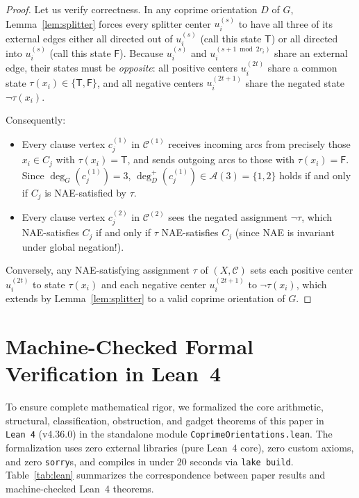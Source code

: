 \documentclass[11pt,a4paper]{article}
\theoremstyle{definition}
\theoremstyle{remark}
\newcommand{\outdeg}{\deg^{+}}
\newcommand{\Aset}{\mathcal{A}}
\begin{document}
\begin{proof}
Let us verify correctness. In any coprime orientation $D$ of $G$, Lemma~\ref{lem:splitter} forces every splitter center $u_i^{(s)}$ to have all three of its external edges either all directed out of $u_i^{(s)}$ (call this state $\mathsf{T}$) or all directed into $u_i^{(s)}$ (call this state $\mathsf{F}$). Because $u_i^{(s)}$ and $u_i^{(s+1 \bmod 2r_i)}$ share an external edge, their states must be \emph{opposite}: all positive centers $u_i^{(2t)}$ share a common state $\tau(x_i) \in \{\mathsf{T}, \mathsf{F}\}$, and all negative centers $u_i^{(2t+1)}$ share the negated state $\neg \tau(x_i)$.

Consequently:
\begin{itemize}[leftmargin=2em,itemsep=1pt]
  \item Every clause vertex $c_j^{(1)}$ in $\mathcal{C}^{(1)}$ receives incoming arcs from precisely those $x_i \in C_j$ with $\tau(x_i) = \mathsf{T}$, and sends outgoing arcs to those with $\tau(x_i) = \mathsf{F}$. Since $\deg_G(c_j^{(1)}) = 3$, $\outdeg_D(c_j^{(1)}) \in \Aset(3) = \{1, 2\}$ holds if and only if $C_j$ is NAE-satisfied by $\tau$.
  \item Every clause vertex $c_j^{(2)}$ in $\mathcal{C}^{(2)}$ sees the negated assignment $\neg \tau$, which NAE-satisfies $C_j$ if and only if $\tau$ NAE-satisfies $C_j$ (since NAE is invariant under global negation!).
\end{itemize}
Conversely, any NAE-satisfying assignment $\tau$ of $(X, \mathcal{C})$ sets each positive center $u_i^{(2t)}$ to state $\tau(x_i)$ and each negative center $u_i^{(2t+1)}$ to $\neg \tau(x_i)$, which extends by Lemma~\ref{lem:splitter} to a valid coprime orientation of $G$.
\end{proof}

\section{Machine-Checked Formal Verification in Lean~4}

To ensure complete mathematical rigor, we formalized the core arithmetic, structural, classification, obstruction, and gadget theorems of this paper in \texttt{Lean~4} (v4.36.0) in the standalone module \texttt{CoprimeOrientations.lean}. The formalization uses zero external libraries (pure Lean~4 core), zero custom axioms, and zero \texttt{sorry}s, and compiles in under $20$ seconds via \texttt{lake build}. Table~\ref{tab:lean} summarizes the correspondence between paper results and machine-checked Lean~4 theorems.
\end{document}
